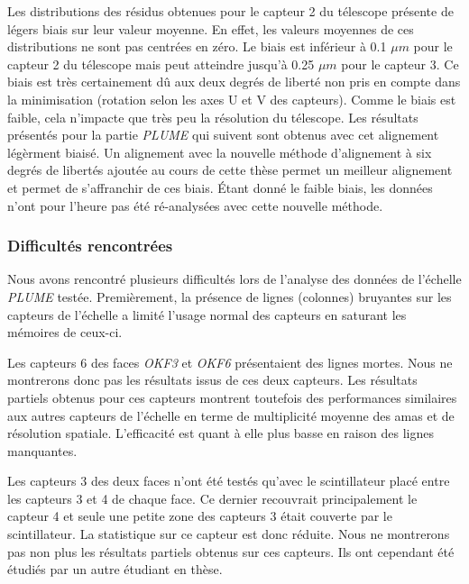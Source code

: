   \medskip
  
  Les distributions des r\'esidus obtenues pour le capteur 2 du t\'elescope pr\'esente de l\'egers biais sur leur valeur moyenne. En effet, les valeurs moyennes de ces distributions ne sont pas centr\'ees en z\'ero. Le biais est inf\'erieur \`a 0.1 $\mu m$ pour le capteur 2 du t\'elescope mais peut atteindre jusqu'\`a 0.25 $\mu m$ pour le capteur 3. Ce biais est tr\`es certainement d\^u aux deux degr\'es de libert\'e non pris en compte dans la minimisation (rotation selon les axes U et V des capteurs). Comme le biais est faible, cela n'impacte que tr\`es peu la r\'esolution du télescope. Les r\'esultats pr\'esent\'es pour la partie \textit{PLUME} qui suivent sont obtenus avec cet alignement l\'eg\`erment biais\'e. Un alignement avec la nouvelle m\'ethode d'alignement \`a six degr\'es de libert\'es ajout\'ee au cours de cette th\`ese permet un meilleur alignement et permet de s'affranchir de ces biais. Étant donn\'e le faible biais, les donn\'ees n'ont pour l'heure pas \'et\'e r\'e-analys\'ees avec cette nouvelle m\'ethode.
  
  \subsubsection{Difficult\'es rencontr\'ees}
  
  Nous avons rencontr\'e plusieurs difficult\'es lors de l'analyse des donn\'ees de l'\'echelle \textit{PLUME} test\'ee. Premi\`erement, la pr\'esence de lignes (colonnes) bruyantes sur les capteurs de l'\'echelle a limit\'e l'usage normal des capteurs en saturant les m\'emoires de ceux-ci. 
  
  \medskip
  
  Les capteurs 6 des faces \textit{OKF3} et \textit{OKF6} pr\'esentaient des lignes mortes. Nous ne montrerons donc pas les r\'esultats issus de ces deux capteurs. Les r\'esultats partiels obtenus pour ces capteurs montrent toutefois des performances similaires aux autres capteurs de l'\'echelle en terme de multiplicit\'e moyenne des amas et de r\'esolution spatiale. L'efficacit\'e est quant \`a elle plus basse en raison des lignes manquantes. 
  
  \medskip
  
  Les capteurs 3 des deux faces n'ont \'et\'e test\'es qu'avec le scintillateur plac\'e entre les capteurs 3 et 4 de chaque face. Ce dernier recouvrait principalement le capteur 4 et seule une petite zone des capteurs 3 \'etait couverte par le scintillateur. La statistique sur ce capteur est donc r\'eduite. Nous ne montrerons pas non plus les r\'esultats partiels obtenus sur ces capteurs. Ils ont cependant \'et\'e \'etudi\'es par un autre \'etudiant en th\`ese.
  
